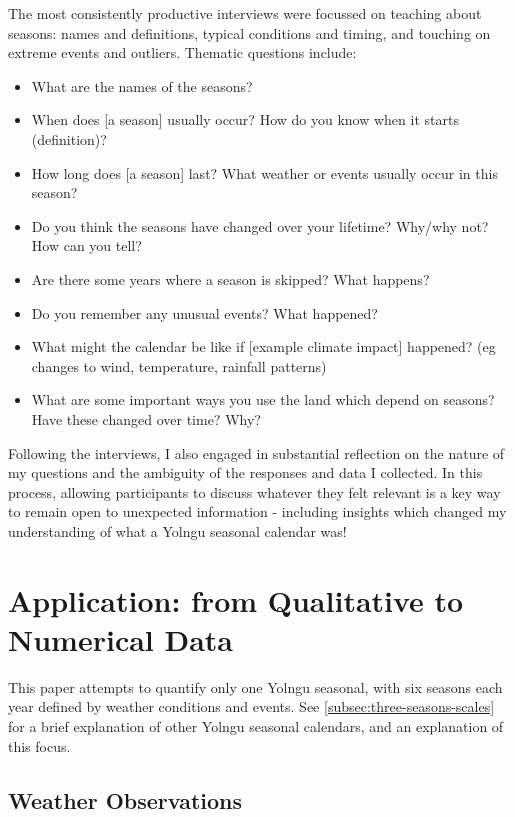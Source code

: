 The most consistently productive interviews were focussed on teaching about
seasons: names and definitions, typical conditions and timing, and touching on
extreme events and outliers. Thematic questions include:
\begin{itemize}
\item What are the names of the seasons?
\item When does [a season] usually occur?  How do you know when it starts (definition)?
\item How long does [a season] last?  What weather or events usually occur in this season?
\item Do you think the seasons have changed over your lifetime?  Why/why not?  How can you tell?
\item Are there some years where a season is skipped?  What happens?
\item Do you remember any unusual events?  What happened?
\item What might the calendar be like if [example climate impact] happened?
      (eg changes to wind, temperature, rainfall patterns)
\item What are some important ways you use the land which depend on seasons?
        Have these changed over time?  Why?
\end{itemize}

Following the interviews, I also engaged in substantial reflection on the nature
of my questions and the ambiguity of the responses and data I collected.
In this process, allowing participants to discuss whatever they felt relevant
is a key way to remain open to unexpected information - including insights
which changed my understanding of what a Yolngu seasonal calendar was!






\section{Application: from Qualitative to Numerical Data}

This paper attempts to quantify only one Yolngu seasonal, with six seasons
each year defined by weather conditions and events.  See
\cref{subsec:three-seasons-scales} for a brief explanation of other
Yolngu seasonal calendars, and an explanation of this focus.


\subsection{Weather Observations}

